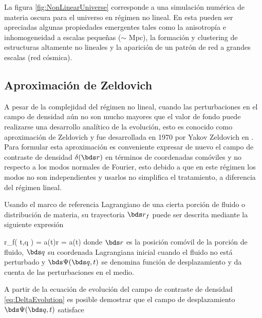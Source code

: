 La figura \ref{fig:NonLinearUniverse} corresponde a una simulación 
numérica de materia oscura para el universo en régimen no lineal. En esta 
pueden ser apreciadas algunas propiedades emergentes tales como la 
anisotropía e inhomogeneidad a escalas peque\-ñas ($\sim$ Mpc), la 
formación y clustering de estructuras altamente no lineales y la aparición 
de un patrón de red a grandes escalas (red cósmica).


	\subsection{Aproximación de Zeldovich}
	\label{subsec:Zeldovich'sApproximation}
	

A pesar de la complejidad del régimen no lineal, cuando las perturbaciones 
en el campo de densidad aún no son mucho mayores que el valor de fondo 
puede realizarse una desarrollo analítico de la evolución, esto es conocido
como aproxi\-mación de Zeldovich y fue desarrollada en 1970 por Yakov 
Zeldovich en \cite{zeldovich1970}. Para formular esta aproximación es 
conveniente expresar de nuevo el campo de contraste de densidad 
$\delta(\bds r)$ en términos de coordenadas comóviles y no respecto a los 
modos normales de Fourier, esto debido a que en este régimen los modos no 
son independientes y usarlos no simplifica el tratamiento, a diferencia 
del régimen lineal. 


Usando el marco de referencia Lagrangiano de una cierta porción de fluido
o distribución de materia, su trayectoria $\bds r_f$ puede ser descrita 
mediante la siguiente expresión


{ \bds r_f( t,\bds q ) = a(t)\bds r = a(t) }
donde $\bds r$ es la posición comóvil de la porción de fluido, $\bds q$ 
su coordenada Lagrangiana inicial cuando el fluido no está perturbado y 
$\bds \Psi(\bds q,t)$ se denomina función de desplazamiento y da cuenta de 
las perturbaciones en el medio. 


A partir de la ecuación de evolución del campo de contraste de densidad 
\ref{eq:DeltaEvolution} es posible demostrar que el campo de desplazamiento 
$\bds \Psi(\bds q,t)$ satisface \cite{Yoshisato2006}


